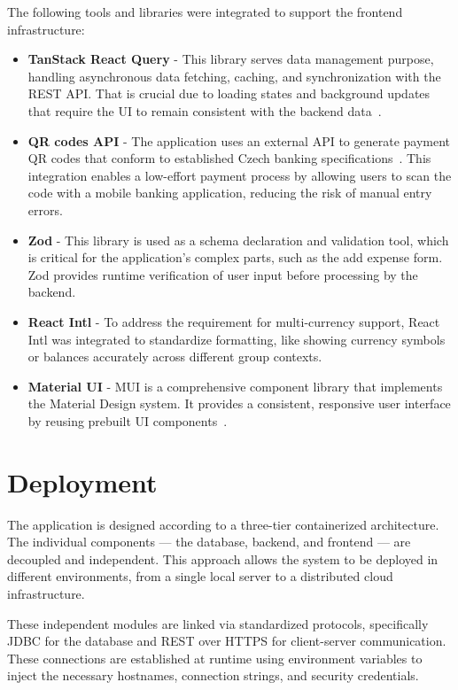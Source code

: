 \documentclass{ctuthesis}
\begin{document}
The following tools and libraries were integrated to support the frontend infrastructure:
\begin{itemize}
    \item \textbf{TanStack React Query} - This library serves data management purpose, handling asynchronous data fetching, caching, and synchronization with the REST API. That is crucial due to loading states and background updates that require the UI to remain consistent with the backend data~\cite{tanstack}. 
    \item \textbf{QR codes API} - The application uses an external API to generate payment QR codes that conform to established Czech banking specifications~\cite{qr}. This integration enables a low-effort payment process by allowing users to scan the code with a mobile banking application, reducing the risk of manual entry errors.
    \item \textbf{Zod} - This library is used as a schema declaration and validation tool, which is critical for the application's complex parts, such as the add expense form. Zod provides runtime verification of user input before processing by the backend.
    \item \textbf{React Intl} - To address the requirement for multi-currency support, React Intl was integrated to standardize formatting, like showing currency symbols or balances accurately across different group contexts.
    \item \textbf{Material UI} - MUI is a comprehensive component library that implements the Material Design system. It provides a consistent, responsive user interface by reusing prebuilt UI components~\cite{mui}.
\end{itemize}

\section{Deployment}
The application is designed according to a three-tier containerized architecture. The individual components — the database, backend, and frontend — are decoupled and independent. This approach allows the system to be deployed in different environments, from a single local server to a distributed cloud infrastructure.

These independent modules are linked via standardized protocols, specifically JDBC for the database and REST over HTTPS for client-server communication. These connections are established at runtime using environment variables to inject the necessary hostnames, connection strings, and security credentials.
\end{document}
